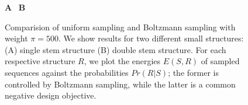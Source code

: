\documentclass[10pt]{article}
\makeatletter
\newlength{\@aligneps}
\newcommand{\includegraphicstop}[2][]{%
\sbox{\@alignepsbox}{\texttt{[image: \#2]}}%
\setlength{\@aligneps}{-\ht\@alignepsbox}%
\addtolength{\@aligneps}{2ex}%
\raisebox{\@aligneps}{\usebox{\@alignepsbox}}}
\makeatother
\begin{document}
\begin{figure}
\textbf{A}~\includegraphicstop[width=0.48\textwidth]{Figs/Plots/stem_weight1-500}%
\textbf{B}~\includegraphicstop[width=0.48\textwidth]{Figs/Plots/doublestem_weight1-500}%
\caption{Comparision of uniform sampling and Boltzmann sampling with
weight $\pi=500$. We show results for two different small structures: (A) single stem structure (B) double stem structure. For each respective structure $R$, we plot the energies $E(S,R)$ of
sampled sequences against the probabilities $Pr(R|S)$; the former is controlled
by Boltzmann sampling, while the latter is a common negative design objective.}
\label{fig:negforpos}
\end{figure}


%
%
%
%
%
%
%

\end{document}
